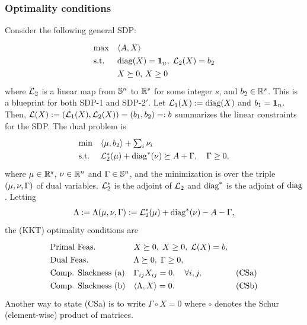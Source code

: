 \subsubsection{Optimality conditions}\label{sec:optim:cond}
Consider the following general SDP:
\begin{align}\label{eq:gen:SDP}
  \def\arraystretch{1.3}
  \begin{array}{ll}
    \max & \ip{A,X} \\
    \text{s.t.} &  \diag(X) = \onev_n, \; \Lc_2(X) = b_2 \\
    & X \succeq 0, \, X \ge 0 
  \end{array}
\end{align}
where $\mathcal{L}_2$ is a linear map from $\mathbb{S}^{n}$ to $\mathbb{R}^s$ for some integer $s$, and $b_2 \in \mathbb{R}^s$. This is a blueprint for both SDP-1 and  SDP-$2'$. Let $\mathcal{L}_1(X) := \operatorname{diag}(X)$ and $b_1 = \bm{1}_n$. Then, 
  $\mathcal{L}(X) := (\mathcal{L}_1(X),\mathcal{L}_2(X)) = (b_1,b_2) =: b$
summarizes the linear constraints for the SDP. The dual problem is
\begin{align*}
  \def\arraystretch{1.3}
  \begin{array}{ll}
    \min & \ip{\mu,b_2} + \sum_i \nu_i \\
    \text{s.t.} 
    & \Lc_2^*(\mu) + \diag^*(\nu) \succeq A + \Gamma, \quad \Gamma \ge 0,
  \end{array}
\end{align*}
where $\mu \in \mathbb{R}^s$, $\nu \in \mathbb{R}^n$ and $\Gamma \in \mathbb{S}^{n}$, and the minimization is over the triple $(\mu,\nu,\Gamma)$ of dual variables. $\mathcal{L}_2^*$ is the adjoint of $\mathcal{L}_2$ and $\operatorname{diag}^*$ is the adjoint of $\operatorname{diag}$.
Letting 
\begin{align}\label{eq:Lambda:def:gen}
\Lambda := \Lambda(\mu,\nu,\Gamma)  := \mathcal{L}_2^*(\mu) + \operatorname{diag}^*(\nu) -A -\Gamma,
\end{align}
the (KKT) optimality conditions are 
\begin{align*}
  \begin{array}{lll}
    \text{Primal Feas. } & X \succeq 0, \; X \ge 0,\; \Lc(X) = b, \\
    \text{Dual Feas.} & \Lambda \succeq 0, \; \Gamma \ge 0,\\
    \text{Comp. Slackness (a)} & \Gamma_{ij} X_{ij} = 0, \quad \forall i,j, & \text{(CSa)}\\
    \text{Comp. Slackness (b)} &\ip{\Lambda,X} = 0. & \text{(CSb)}
  \end{array}
\end{align*}
Another way to state (CSa) is to write $\Gamma \circ X = 0$ where $\circ$ denotes the Schur (element-wise) product of matrices. 

